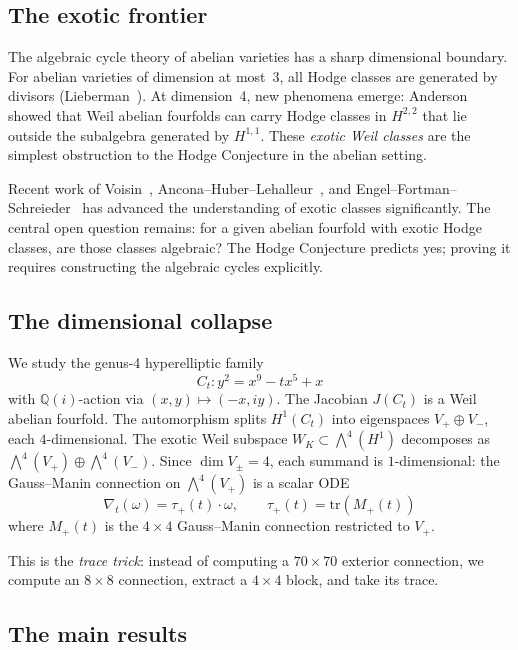 \documentclass[11pt]{article}
\theoremstyle{plain}
\theoremstyle{definition}
\theoremstyle{remark}
\newcommand{\Q}{\mathbb{Q}}
\newcommand{\tr}{\mathrm{tr}}
\begin{document}
\subsection{The exotic frontier}

The algebraic cycle theory of abelian varieties has a sharp dimensional
boundary. For abelian varieties of dimension at most~3, all Hodge classes
are generated by divisors (Lieberman~\cite{Lieberman1968}). At dimension~4,
new phenomena emerge: Anderson~\cite{Anderson1993} showed that Weil abelian
fourfolds can carry Hodge classes in $H^{2,2}$ that lie outside the
subalgebra generated by $H^{1,1}$. These \emph{exotic Weil classes} are the
simplest obstruction to the Hodge Conjecture in the abelian setting.

Recent work of Voisin~\cite{Voisin2024}, Ancona--Huber--Lehalleur~\cite{AHL2024},
and Engel--Fortman--Schreieder~\cite{EFS2025} has advanced the understanding
of exotic classes significantly. The central open question remains: for a
given abelian fourfold with exotic Hodge classes, are those classes algebraic?
The Hodge Conjecture predicts yes; proving it requires constructing the
algebraic cycles explicitly.

\subsection{The dimensional collapse}

We study the genus-4 hyperelliptic family
\[
C_t : y^2 = x^9 - tx^5 + x
\]
with $\Q(i)$-action via $(x,y) \mapsto (-x, iy)$. The Jacobian $J(C_t)$
is a Weil abelian fourfold. The automorphism splits $H^1(C_t)$ into
eigenspaces $V_+ \oplus V_-$, each $4$-dimensional. The exotic Weil
subspace $W_K \subset \bigwedge^4(H^1)$ decomposes as
$\bigwedge^4(V_+) \oplus \bigwedge^4(V_-)$. Since $\dim V_\pm = 4$,
each summand is $1$-dimensional: the Gauss--Manin connection on
$\bigwedge^4(V_+)$ is a scalar ODE
\begin{equation}\label{eq:scalar}
\nabla_t(\omega) = \tau_+(t) \cdot \omega, \qquad
\tau_+(t) = \tr(M_+(t))
\end{equation}
where $M_+(t)$ is the $4 \times 4$ Gauss--Manin connection restricted
to $V_+$.

This is the \emph{trace trick}: instead of computing a $70 \times 70$
exterior connection, we compute an $8 \times 8$ connection, extract a
$4 \times 4$ block, and take its trace.

\subsection{The main results}
\end{document}
